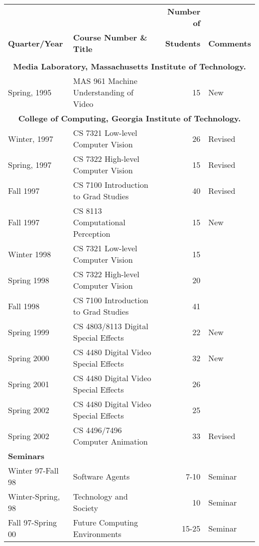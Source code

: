 \begin{center}
\begin{tabular}{llrl}

& & \textbf{Number of \newline } &\\
\textbf{Quarter/Year} & \textbf{Course Number \& Title} &
\textbf{Students} & \textbf{Comments} \\ \hline \\[\tabitemskip]

\multicolumn{4}{c}{\textbf{Media Laboratory, Massachusetts
Institute of Technology.}}\\[\tabitemskip]

Spring, 1995 & MAS 961 Machine Understanding of Video & 15 & New\\[\tabitemskip]

\multicolumn{4}{c}{\textbf{College of Computing, Georgia
Institute of Technology.}}\\[\tabitemskip]

Winter, 1997  & CS 7321 Low-level Computer Vision & 26  & Revised\\[\tabitemskip]
Spring, 1997 & CS 7322 High-level Computer Vision & 15 & Revised\\[\tabitemskip]
Fall 1997 & CS 7100 Introduction to Grad Studies  & 40  & Revised\\[\tabitemskip]
Fall 1997 & CS 8113 Computational Perception  & 15  & New \\[\tabitemskip]
Winter 1998  & CS 7321 Low-level Computer Vision  & 15 & \\[\tabitemskip]
Spring 1998  & CS 7322 High-level Computer Vision  & 20 & \\[\tabitemskip]
Fall 1998  & CS 7100 Introduction to Grad Studies  & 41 & \\[\tabitemskip]
Spring 1999  & CS 4803/8113 Digital Special Effects  & 22  & New\\[\tabitemskip]
Spring 2000 &  CS 4480 Digital Video Special Effects &  32  &
New\\[\tabitemskip]
Spring 2001 &  CS 4480 Digital Video Special Effects &  26
&\\[\tabitemskip]
Spring 2002 &  CS 4480 Digital Video Special Effects & 25
&  \\[\tabitemskip]
Spring 2002 &  CS 4496/7496 Computer Animation & 33
& Revised \\[\tabitemskip]
\multicolumn{4}{l}{\textbf{Seminars}}\\[\tabitemskip]
Winter 97-Fall 98 & Software Agents & 7-10 & Seminar\\[\tabitemskip]
Winter-Spring, 98 & Technology and Society & 10& Seminar\\[\tabitemskip]
Fall 97-Spring 00 & Future Computing Environments &  15-25 &
Seminar


\end{tabular}
\end{center}


